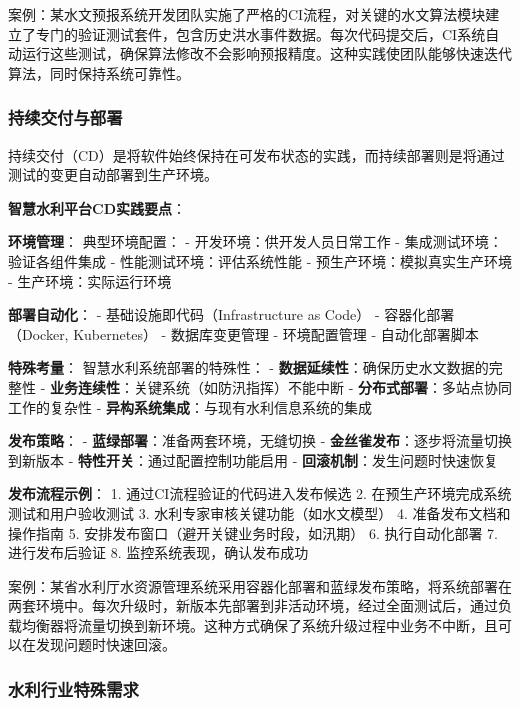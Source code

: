 案例：某水文预报系统开发团队实施了严格的CI流程，对关键的水文算法模块建立了专门的验证测试套件，包含历史洪水事件数据。每次代码提交后，CI系统自动运行这些测试，确保算法修改不会影响预报精度。这种实践使团队能够快速迭代算法，同时保持系统可靠性。

\subsubsection{持续交付与部署}\label{ux6301ux7eedux4ea4ux4ed8ux4e0eux90e8ux7f72}

持续交付（CD）是将软件始终保持在可发布状态的实践，而持续部署则是将通过测试的变更自动部署到生产环境。

\textbf{智慧水利平台CD实践要点}：

\textbf{环境管理}： 典型环境配置： - 开发环境：供开发人员日常工作 -
集成测试环境：验证各组件集成 - 性能测试环境：评估系统性能 -
预生产环境：模拟真实生产环境 - 生产环境：实际运行环境

\textbf{部署自动化}： - 基础设施即代码（Infrastructure as Code） -
容器化部署（Docker, Kubernetes） - 数据库变更管理 - 环境配置管理 -
自动化部署脚本

\textbf{特殊考量}： 智慧水利系统部署的特殊性： -
\textbf{数据延续性}：确保历史水文数据的完整性 -
\textbf{业务连续性}：关键系统（如防汛指挥）不能中断 -
\textbf{分布式部署}：多站点协同工作的复杂性 -
\textbf{异构系统集成}：与现有水利信息系统的集成

\textbf{发布策略}： - \textbf{蓝绿部署}：准备两套环境，无缝切换 -
\textbf{金丝雀发布}：逐步将流量切换到新版本 -
\textbf{特性开关}：通过配置控制功能启用 -
\textbf{回滚机制}：发生问题时快速恢复

\textbf{发布流程示例}： 1. 通过CI流程验证的代码进入发布候选 2.
在预生产环境完成系统测试和用户验收测试 3.
水利专家审核关键功能（如水文模型） 4. 准备发布文档和操作指南 5.
安排发布窗口（避开关键业务时段，如汛期） 6. 执行自动化部署 7.
进行发布后验证 8. 监控系统表现，确认发布成功

案例：某省水利厅水资源管理系统采用容器化部署和蓝绿发布策略，将系统部署在两套环境中。每次升级时，新版本先部署到非活动环境，经过全面测试后，通过负载均衡器将流量切换到新环境。这种方式确保了系统升级过程中业务不中断，且可以在发现问题时快速回滚。

\subsubsection{水利行业特殊需求}\label{ux6c34ux5229ux884cux4e1aux7279ux6b8aux9700ux6c42}


